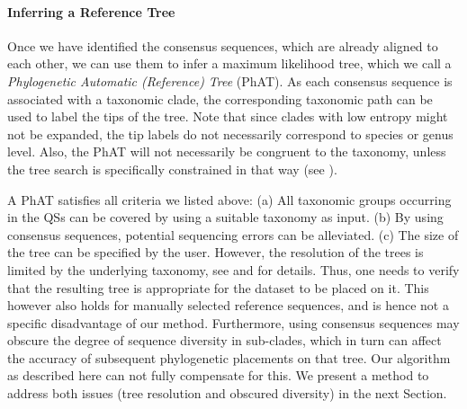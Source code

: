 

\paragraph{Inferring a Reference Tree}
\label{ch:AutomaticTrees:sec:Methods:sub:PhAT:par:InferringReferenceTree}

Once we have identified the consensus sequences, which are already aligned to each other,
we can use them to infer a maximum likelihood tree, which we call a \emph{Phylogenetic Automatic (Reference) Tree} (PhAT).
As each consensus sequence is associated with a taxonomic clade,
the corresponding taxonomic path can be used to label the tips of the tree.
Note that since clades with low entropy might not be expanded,
the tip labels do not necessarily correspond to species or genus level.
Also, the \ac{PhAT} will not necessarily be congruent to the taxonomy,
unless the tree search is specifically constrained in that way
(see ).

A \ac{PhAT} satisfies all criteria we listed above:
(a) All taxonomic groups occurring in the \acp{QS} can be covered by using a suitable taxonomy as input.
(b) By using consensus sequences, potential sequencing errors can be alleviated.
(c) The size of the tree can be specified by the user.
However, the resolution of the trees is limited by the underlying taxonomy,
see 
and  for details.
Thus, one needs to verify that the resulting tree is appropriate for the dataset to be placed on it.
This however also holds for manually selected reference sequences,
and is hence not a specific disadvantage of our method.
Furthermore, using consensus sequences may obscure the degree of sequence diversity in sub-clades,
which in turn can affect the accuracy of subsequent phylogenetic placements on that tree.
Our algorithm as described here can not fully compensate for this.
We present a method to address both issues (tree resolution and obscured diversity) in the next Section.

